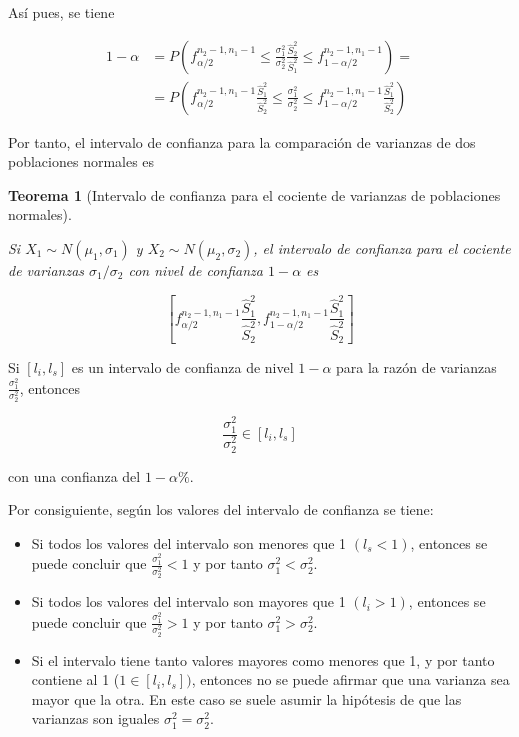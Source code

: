 \documentclass[
  a4paper,
]{scrreport}
\providecommand{\tightlist}{%
  \setlength{\itemsep}{0pt}\setlength{\parskip}{0pt}}\usepackage{longtable,booktabs,array}
\theoremstyle{plain}
\newtheorem{theorem}{Teorema}[chapter]
\theoremstyle{definition}
\theoremstyle{definition}
\theoremstyle{remark}
\begin{document}
Así pues, se tiene

\begin{align*}
1-\alpha &= P\left(f^{n_2-1,n_1-1}_{\alpha/2}\leq \frac{\sigma_1^2}{\sigma_2^2}\frac{\hat{S}_2^2}{\hat{S}_1^2}  \leq
f^{n_2-1,n_1-1}_{1-\alpha/2}\right) = \\ &= P\left(f^{n_2-1,n_1-1}_{\alpha/2}\frac{\hat{S}_1^2}{\hat{S}_2^2} \leq
\frac{\sigma_1^2}{\sigma_2^2}  \leq f^{n_2-1,n_1-1}_{1-\alpha/2}\frac{\hat{S}_1^2}{\hat{S}_2^2}\right)
\end{align*}

Por tanto, el intervalo de confianza para la comparación de varianzas de
dos poblaciones normales es

\begin{theorem}[Intervalo de confianza para el cociente de varianzas de
poblaciones
normales]\protect\hypertarget{thm-intervalo-confianza-cociente-varianzas-normales-varianzas}{}\label{thm-intervalo-confianza-cociente-varianzas-normales-varianzas}

Si \(X_1\sim N(\mu_1,\sigma_1)\) y \(X_2\sim N(\mu_2,\sigma_2)\), el
\emph{intervalo de confianza para el cociente de varianzas}
\(\sigma_1/\sigma_2\) con nivel de confianza \(1-\alpha\) es

\[
\left[f^{n_2-1,n_1-1}_{\alpha/2}\frac{\hat{S}_1^2}{\hat{S}_2^2},f^{n_2-1,n_1-1}_{1-\alpha/2}\frac{\hat{S}_1^2}{\hat{S}_2^2}\right]
\]

\end{theorem}

Si \([l_i,l_s]\) es un intervalo de confianza de nivel \(1-\alpha\) para
la razón de varianzas \(\frac{\sigma_1^2}{\sigma_2^2}\), entonces

\[
\frac{\sigma_1^2}{\sigma_2^2} \in [l_i,l_s]
\]

con una confianza del \(1-\alpha\%\).

Por consiguiente, según los valores del intervalo de confianza se tiene:

\begin{itemize}
\tightlist
\item
  Si todos los valores del intervalo son menores que 1 \((l_s<1)\),
  entonces se puede concluir que \(\frac{\sigma_1^2}{\sigma_2^2}<1\) y
  por tanto \(\sigma_1^2<\sigma_2^2\).
\item
  Si todos los valores del intervalo son mayores que 1 \((l_i>1)\),
  entonces se puede concluir que \(\frac{\sigma_1^2}{\sigma_2^2}>1\) y
  por tanto \(\sigma_1^2>\sigma_2^2\).
\item
  Si el intervalo tiene tanto valores mayores como menores que 1, y por
  tanto contiene al 1 (\(1\in [l_i,l_s])\), entonces no se puede afirmar
  que una varianza sea mayor que la otra. En este caso se suele asumir
  la hipótesis de que las varianzas son iguales
  \(\sigma_1^2=\sigma_2^2\).
\end{itemize}
\end{document}

